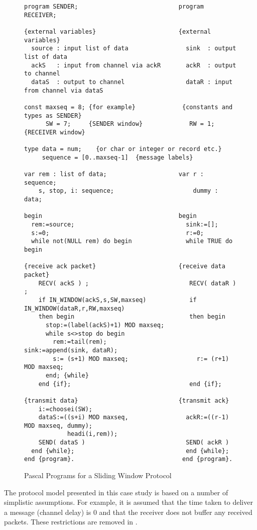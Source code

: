 \begin{figure}
  \footnotesize
  \begin{verbatim}
program SENDER;                            program RECEIVER;

{external variables}                       {external variables} 
  source : input list of data                sink  : output list of data
  ackS   : input from channel via ackR       ackR  : output to channel
  dataS  : output to channel                 dataR : input from channel via dataS

const maxseq = 8; {for example}             {constants and types as SENDER}
      SW = 7;     {SENDER window}             RW = 1;     {RECEIVER window}

type data = num;    {or char or integer or record etc.}
     sequence = [0..maxseq-1]  {message labels}

var rem : list of data;                    var r : sequence;
    s, stop, i: sequence;                      dummy : data;
    
begin                                      begin
  rem:=source;                               sink:=[];
  s:=0;                                      r:=0;
  while not(NULL rem) do begin               while TRUE do begin

{receive ack packet}                       {receive data packet}
    RECV( ackS ) ;                            RECV( dataR ) ;
    if IN_WINDOW(ackS,s,SW,maxseq)            if IN_WINDOW(dataR,r,RW,maxseq) 
    then begin                                then begin
      stop:=(label(ackS)+1) MOD maxseq;
      while s<>stop do begin                    
        rem:=tail(rem);                         sink:=append(sink, dataR);
        s:= (s+1) MOD maxseq;                   r:= (r+1) MOD maxseq;
      end; {while}
    end {if};                                 end {if};

{transmit data}                            {transmit ack}
    i:=choosei(SW);
    dataS:=((s+i) MOD maxseq,                ackR:=((r-1) MOD maxseq, dummy);
            headi(i,rem));
    SEND( dataS )                            SEND( ackR )
  end {while};                               end {while};
end {program}.                              end {program}.
  \end{verbatim}
  \caption{Pascal Programs for a Sliding Window Protocol}
  \label{fig:pascal}
\end{figure}
\normalsize


The protocol model presented in this case study is based on a number of
simplistic assumptions.  For example, it is assumed that the time taken to
deliver a message (channel delay) is 0 and that the receiver does not buffer
any received packets.  
These restrictions are removed in \cite{cardell.tapsoft}.


